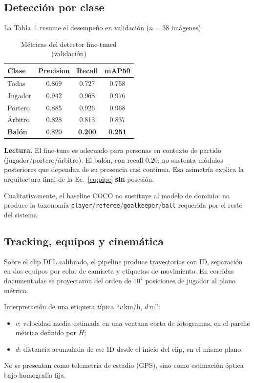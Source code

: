 \documentclass[conference]{IEEEtran}
\begin{document}
\subsection{Detección por clase}
La Tabla~\ref{tab:map} resume el desempeño en validación ($n=38$ imágenes).

\begin{table}[!t]
\caption{Métricas del detector fine-tuned (validación)}
\label{tab:map}
\centering
\begin{tabular}{@{}lccc@{}}
\toprule
\textbf{Clase} & \textbf{Precision} & \textbf{Recall} & \textbf{mAP50} \\
\midrule
Todas & 0.869 & 0.727 & 0.758 \\
Jugador & 0.942 & 0.968 & 0.976 \\
Portero & 0.885 & 0.926 & 0.968 \\
Árbitro & 0.828 & 0.813 & 0.837 \\
\textbf{Balón} & 0.820 & \textbf{0.200} & \textbf{0.251} \\
\bottomrule
\end{tabular}
\end{table}

\textbf{Lectura.} El fine-tune es adecuado para personas en contexto de partido (jugador/portero/árbitro). El balón, con recall $0.20$, no sustenta módulos posteriores que dependan de su presencia casi continua. Esa asimetría explica la arquitectura final de la Ec.~\eqref{eq:pipe} \textbf{sin} posesión.

Cualitativamente, el baseline COCO no sustituye al modelo de dominio: no produce la taxonomía \texttt{player}/\texttt{referee}/\texttt{goalkeeper}/\texttt{ball} requerida por el resto del sistema.

\subsection{Tracking, equipos y cinemática}
Sobre el clip DFL calibrado, el pipeline produce trayectorias con ID, separación en dos equipos por color de camiseta y etiquetas de movimiento. En corridas documentadas se proyectaron del orden de $10^{4}$ posiciones de jugador al plano métrico.

Interpretación de una etiqueta típica ``$v$\,km/h, $d$\,m'':
\begin{itemize}[leftmargin=*,itemsep=1pt]
  \item $v$: velocidad media estimada en una ventana corta de fotogramas, en el parche métrico definido por $H$;
  \item $d$: distancia acumulada de ese ID desde el inicio del clip, en el mismo plano.
\end{itemize}
No se presentan como telemetría de estadio (GPS), sino como estimación óptica bajo homografía fija.
\end{document}
